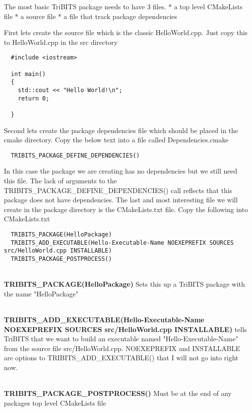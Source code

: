 \documentclass[12pt]{article}
\begin{document}
The most basic TriBITS package needs to have 3 files.
* a top level CMakeLists file
* a source file
* a file that track package dependencies

First lets create the source file which is the classic HelloWorld.cpp.  Just 
copy this to HelloWorld.cpp in the src directory

\begin{verbatim}
  #include <iostream>

  int main()
  {
    std::cout << "Hello World!\n";
    return 0;

  }
\end{verbatim}

Second lets create the package dependencies file which should be
placed in the cmake directory.  Copy the below text into a file called
Dependencies.cmake

\begin{verbatim}
  TRIBITS_PACKAGE_DEFINE_DEPENDENCIES()
\end{verbatim}

In this case the package we are creating has no dependencies but we
still need this file.  The lack of arguments to the
TRIBITS\_PACKAGE\_DEFINE\_DEPENDENCIES() call reflects that this package
does not have dependencies.  The last and most interesting file we
will create in the package directory is the CMakeLists.txt file.  Copy
the following into CMakeLists.txt

\begin{verbatim}
  TRIBITS_PACKAGE(HelloPackage)
  TRIBITS_ADD_EXECUTABLE(Hello-Executable-Name NOEXEPREFIX SOURCES src/HelloWorld.cpp INSTALLABLE)
  TRIBITS_PACKAGE_POSTPROCESS()
\end{verbatim}

\textbf{\\TRIBITS\_PACKAGE(HelloPackage)} Sets this up a TriBITS package
with the name "HelloPackage"

\textbf{\\TRIBITS\_ADD\_EXECUTABLE(Hello-Executable-Name NOEXEPREFIX SOURCES
  src/HelloWorld.cpp INSTALLABLE)} tells TriBITS that we want to build
an executable named "Hello-Executable-Name" from the source file
src/HelloWorld.cpp.  NOEXEPREFIX and INSTALLABLE are options to
TRIBITS\_ADD\_EXECUTABLE() that I will not go into right now.

\textbf{\\TRIBITS\_PACKAGE\_POSTPROCESS()} Must be at the end of any
packages top level CMakeLists file

\end{document}
